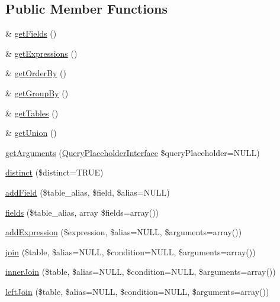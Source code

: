 \subsection*{Public Member Functions}
\begin{DoxyCompactItemize}
\item 
\& \hyperlink{interfaceSelectQueryInterface_abcddf4751e4bd1a166752ea7e645135c}{getFields} ()
\item 
\& \hyperlink{interfaceSelectQueryInterface_a80eae8260f7ae7d3d782573f7030d96d}{getExpressions} ()
\item 
\& \hyperlink{interfaceSelectQueryInterface_a1974a1b815f3aab066792056ed38ea70}{getOrderBy} ()
\item 
\& \hyperlink{interfaceSelectQueryInterface_a3b14e2f648470ff5f2969bc431ab7ae1}{getGroupBy} ()
\item 
\& \hyperlink{interfaceSelectQueryInterface_a094adc173e6f2226f09304dab9fbe4a1}{getTables} ()
\item 
\& \hyperlink{interfaceSelectQueryInterface_a6b3e1fad3a484863d3b77971649d4a56}{getUnion} ()
\item 
\hyperlink{interfaceSelectQueryInterface_ae033466efee1ce7d14b64f1d6b23e4a2}{getArguments} (\hyperlink{interfaceQueryPlaceholderInterface}{QueryPlaceholderInterface} \$queryPlaceholder=NULL)
\item 
\hyperlink{interfaceSelectQueryInterface_aae70694b2ee2b596a7b7d3e2c25814ee}{distinct} (\$distinct=TRUE)
\item 
\hyperlink{interfaceSelectQueryInterface_a1c8331825723867ceba20436a6ea5ed1}{addField} (\$table\_\-alias, \$field, \$alias=NULL)
\item 
\hyperlink{interfaceSelectQueryInterface_a7e5fcf83e82fe4f5b97d60bfccf2bb7f}{fields} (\$table\_\-alias, array \$fields=array())
\item 
\hyperlink{interfaceSelectQueryInterface_a85b30bde2daad80cb614d7d1f5b8dae3}{addExpression} (\$expression, \$alias=NULL, \$arguments=array())
\item 
\hyperlink{interfaceSelectQueryInterface_a596614bc76873c1487f87d30f892a651}{join} (\$table, \$alias=NULL, \$condition=NULL, \$arguments=array())
\item 
\hyperlink{interfaceSelectQueryInterface_ab359fd116625504a297d7fd4222f2564}{innerJoin} (\$table, \$alias=NULL, \$condition=NULL, \$arguments=array())
\item 
\hyperlink{interfaceSelectQueryInterface_ab3dcfdd428727d5a2f4890296807b27a}{leftJoin} (\$table, \$alias=NULL, \$condition=NULL, \$arguments=array())

\end{DoxyCompactItemize}
